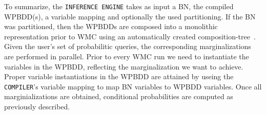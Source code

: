 To summarize, the \texttt{INFERENCE ENGINE} takes as input a BN, the compiled WPBDD(s), a variable mapping and optionally the used partitioning. If the BN was partitioned, then the WPBDDs are composed into a monolithic representation prior to WMC using an automatically created composition-tree~\cite{dal2021compositional}. Given the user's set of probabilitic queries, the corresponding marginalizations are performed in parallel. Prior to every WMC run we need to instantiate the variables in the WPBDD, reflecting the marginalization we want to achieve. Proper variable instantiations in the WPBDD are attained by useing the \texttt{COMPILER}'s variable mapping to map BN variables to WPBDD variables. Once all marginializations are obtained, conditional probabilities are computed as previously described.


